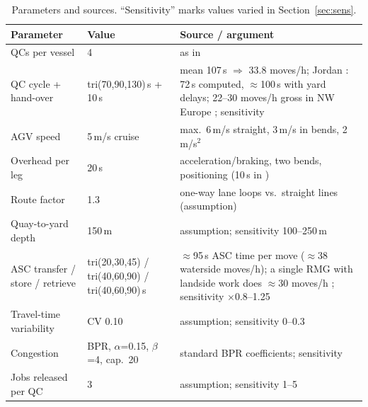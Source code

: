 \documentclass[11pt,a4paper]{article}
\begin{document}
\begin{table}[H]
\centering\small
\caption{Parameters and sources. ``Sensitivity'' marks values varied in Section~\ref{sec:sens}.}
\label{tab:params}
\begin{tabular}{p{3.9cm}p{3.4cm}p{7.9cm}}
\toprule
Parameter & Value & Source / argument \\
\midrule
QCs per vessel & 4 & as in \cite{gerrits2018} \\
QC cycle + hand-over & tri(70,90,130)\,s + 10\,s & mean 107\,s $\Rightarrow$ 33.8 moves/h; Jordan \cite{jordan2002}: 72\,s computed, $\approx$100\,s with yard delays; 22--30 moves/h gross in NW Europe \cite{saanen2003}; sensitivity \\
AGV speed & 5\,m/s cruise & max.\ 6\,m/s straight, 3\,m/s in bends, 2\,m/s$^2$ \cite{saputra2021} \\
Overhead per leg & 20\,s & acceleration/braking, two bends, positioning (10\,s in \cite{watson2005}) \\
Route factor & 1.3 & one-way lane loops vs.\ straight lines (assumption) \\
Quay-to-yard depth & 150\,m & assumption; sensitivity 100--250\,m \\
ASC transfer / store / retrieve & tri(20,30,45) / tri(40,60,90) / tri(40,60,90)\,s & $\approx$95\,s ASC time per move ($\approx$38 waterside moves/h); a single RMG with landside work does $\approx$30 moves/h \cite{watson2005}; sensitivity $\times$0.8--1.25 \\
Travel-time variability & CV 0.10 & assumption; sensitivity 0--0.3 \\
Congestion & BPR, $\alpha$=0.15, $\beta$=4, cap.\ 20 & standard BPR coefficients; sensitivity \\
Jobs released per QC & 3 & assumption; sensitivity 1--5 \\
\bottomrule
\end{tabular}
\end{table}
\end{document}
